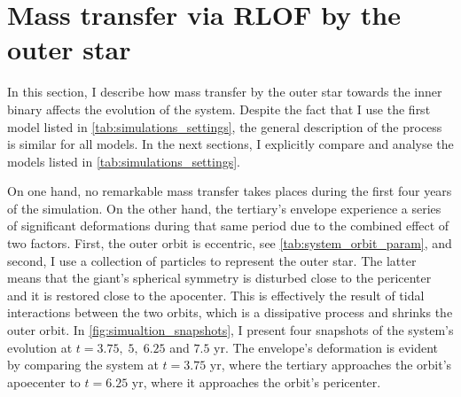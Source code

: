 \section{Mass transfer via RLOF by the outer star}\label{sec:mass_transfer_RLOF}

In this section, I describe how mass transfer by the outer star towards the inner binary affects the evolution of the system. Despite the fact that I use the first model listed in \cref{tab:simulations_settings}, the general description of the process is similar for all models. In the next sections, I explicitly compare and analyse the models listed in \cref{tab:simulations_settings}.

On one hand, no remarkable mass transfer takes places during the first four years of the simulation. On the other hand, the tertiary's envelope experience a series of significant deformations during that same period due to the combined effect of two factors. First, the outer orbit is eccentric, see \cref{tab:system_orbit_param}, and second, I use a collection of particles to represent the outer star. The latter means that the giant's spherical symmetry is disturbed close to the pericenter and it is restored close to the apocenter. This is effectively the result of tidal interactions between the two orbits, which is a dissipative process and shrinks the outer orbit. In \cref{fig:simualtion_snapshots}, I present four snapshots of the system's evolution at $t = 3.75, \; 5, \; 6.25$ and $7.5$ yr. The envelope's deformation is evident by comparing the system at $t = 3.75$ yr, where the tertiary approaches the orbit's apoecenter to $t = 6.25$ yr, where it approaches the orbit's pericenter.
